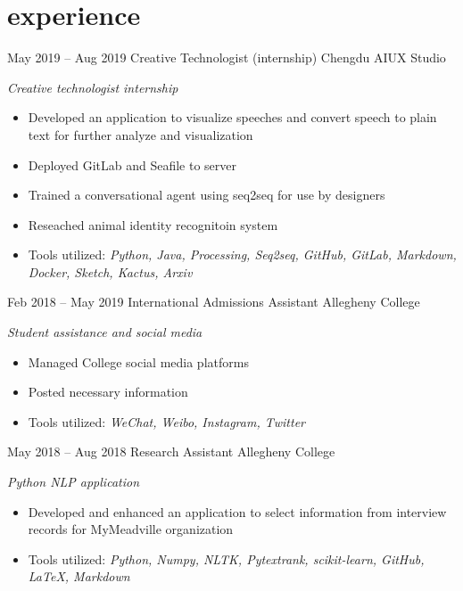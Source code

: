 \documentclass[]{friggeri-cv}
\begin{document}
\section{experience}
\begin{entrylist}
  \entry
    {May 2019 -- Aug 2019}
    {Creative Technologist (internship)}
    {Chengdu AIUX Studio}
    {\emph{Creative technologist internship}
    \begin{itemize}[leftmargin=1.2em]
    \item Developed an application to visualize speeches and convert speech to plain text for further analyze and visualization
    \item Deployed GitLab and Seafile to server
    \item Trained a conversational agent using seq2seq for use by designers
    \item Reseached animal identity recognitoin system
    \item Tools utilized: \emph{Python, Java, Processing, Seq2seq, GitHub, GitLab, Markdown, Docker, Sketch, Kactus, Arxiv}
    \end{itemize}}
  \entry
    {Feb 2018 -- May 2019}
    {International Admissions Assistant}
    {Allegheny College}
    {\emph{Student assistance and social media}
    \begin{itemize}[leftmargin=1.2em]
    \item Managed College social media platforms
    \item Posted necessary information
    \item Tools utilized: \emph{WeChat, Weibo, Instagram, Twitter}
    \end{itemize}}
  \entry
    {May 2018 -- Aug 2018}
    {Research Assistant}
    {Allegheny College}
    {\emph{Python NLP application}
    \begin{itemize}[leftmargin=1.2em]
    \item Developed and enhanced an application to select information from interview records for MyMeadville organization
    \item Tools utilized: \emph{Python, Numpy, NLTK, Pytextrank, scikit-learn, GitHub, \LaTeX, Markdown}
    \end{itemize}}
\end{entrylist}
\end{document}
